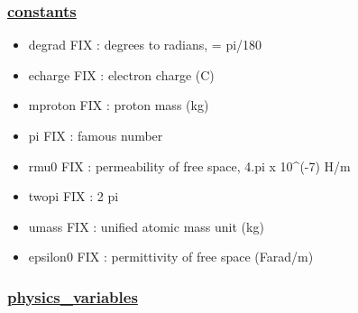 \documentclass[]{article}
\providecommand{\tightlist}{%
  \setlength{\itemsep}{0pt}\setlength{\parskip}{0pt}}
\begin{document}
\subsubsection{\texorpdfstring{\href{constants.html}{constants}}{constants}}\label{constants}

\begin{itemize}
\tightlist
\item
  degrad FIX : degrees to radians, = pi/180
\item
  echarge FIX : electron charge (C)
\item
  mproton FIX : proton mass (kg)
\item
  pi FIX : famous number
\item
  rmu0 FIX : permeability of free space, 4.pi x 10\^{}(-7) H/m
\item
  twopi FIX : 2 pi
\item
  umass FIX : unified atomic mass unit (kg)
\item
  epsilon0 FIX : permittivity of free space (Farad/m)
\end{itemize}

\subsubsection{\texorpdfstring{\href{physics_variables.html}{physics\_variables}}{physics\_variables}}\label{physics_variables}
\end{document}
